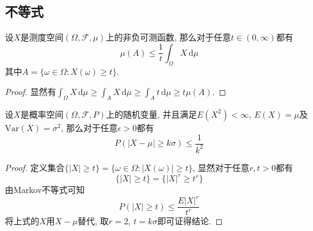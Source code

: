 \documentclass[cn, 12pt, math=mtpro2, bibstyle=apa, blue, twocol]{elegantbook}
\newcommand{\F}{\mathcal{F}}
\begin{document}
\subsection{不等式}
\begin{theorem}[Markov不等式]
设$X$是测度空间$(\Omega,\F,\mu)$上的非负可测函数, 那么对于任意$t\in (0,\infty)$都有
\begin{equation}\label{eq1.15}
  \mu(A)\leq\frac{1}{t}\int_\Omega X\,\text{d}\mu
\end{equation}
其中$A=\{\omega\in\Omega: X(\omega)\geq t\}$.
\end{theorem}
\begin{proof}
  显然有$\int_\Omega X\,\text{d}\mu\geq\int_AX\,\text{d}\mu\geq\int_At\,\text{d}\mu\geq t\mu(A)$.
\end{proof}
\begin{corollary}[Chebyshev不等式]
设$X$是概率空间$(\Omega,\F,P)$上的随机变量, 并且满足$E(X^2)<\infty$, $E(X)=\mu$及$\text{Var}(X)=\sigma^2$, 那么对于任意$\epsilon>0$都有
$$P(|X-\mu|\geq k\sigma)\leq\frac{1}{k^2}$$
\end{corollary}
\begin{proof}
  定义集合$\{|X|\geq t\}=\{\omega\in\Omega: |X(\omega)|\geq t\}$, 显然对于任意$r, t>0$都有
  $$\{|X|\geq t\}=\{|X|^r\geq t^r\}$$
  由Markov不等式可知
  \begin{equation}\label{eq1.30}
    P(|X|\geq t)\leq \frac{E|X|^r}{t^r}
  \end{equation}
  将上式的$X$用$X-\mu$替代, 取$r=2$, $t=k\sigma$即可证得结论.
\end{proof}
\end{document}
